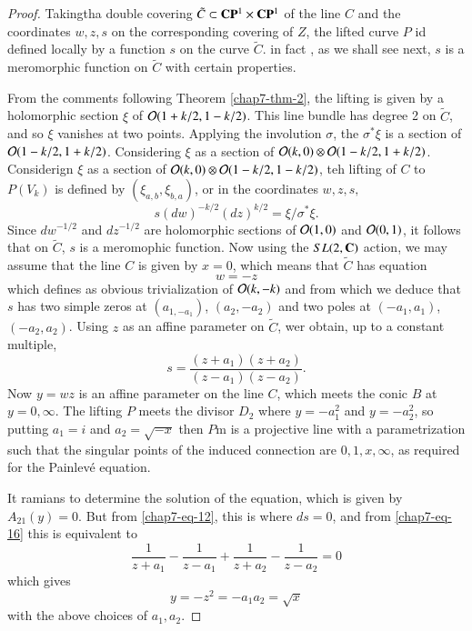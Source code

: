 \begin{proof}
Taking\pageoriginale tha double covering $\tilde{C} \subset \mathbf{C}\mathbf{P}^{1} \times \mathbf{C}\mathbf{P}^{1}$ of the line $C$ and the coordinates $w,z,s$ on the corresponding covering of $Z$, the lifted curve $P$ id defined locally by a function $s$ on the curve
$\tilde{C}$. in fact , as we shall see next, $s$ is a meromorphic function on $\tilde{C}$ with certain properties.

From the comments following Theorem \ref{chap7-thm-2}, the lifting is given by a holomorphic section $\xi$ of $\mathcal{O}(1+k/2, 1-k/2)$. This line bundle has degree 2 on $\tilde{C}$, and so $\xi$ vanishes at two points. Applying the involution $\sigma$, the $\sigma^{*}\xi$ is a section of $\mathcal{O}(1-k/2, 1+k/2)$. Considering $\xi$ as a section of $\mathcal{O}(k,0)\otimes \mathcal{O}(1-k/2, 1+k/2)$. Considerign $\xi$ as a section of $\mathcal{O}(k, 0)\otimes \mathcal{O}(1-k/2, 1-k/2)$, teh lifting of $C$ to $P(V_{k})$ is defined by $(\xi_{a,b}, \xi_{b,a})$, or in the coordinates $w,z,s,$
\begin{equation*}\label{chap7-eq-15}
s(dw)^{-k/2}(dz)^{k/2} = \xi/\sigma^{*}\xi.\tag{15}
\end{equation*}
Since $dw^{-1/2}$ and $dz^{-1/2}$ are holomorphic sections of $\mathcal{O}(1,0)$ and $\mathcal{O}(0,1)$, it follows that on $\tilde{C}$, $s$ is a meromophic function. Now using the $SL(2, \mathbf{C})$ action, we may assume that the line $C$ is given by $x=0$, which means that $\tilde{C}$ has equation
$$
w= -z
$$
which defines as obvious trivialization of $\mathcal{O}(k,-k)$ and from which we deduce that $s$ has  two simple zeros at $(a_{1,-a_{1}})$, $(a_{2}, -a_{2})$ and two poles at $(-a_{1}, a_{1})$, $(-a_{2}, a_{2})$. Using $z$ as an affine parameter on $\tilde{C}$, wer obtain, up to a constant multiple,
\begin{equation*}\label{chap7-eq-16}
s = \dfrac{(z+a_{1})(z+a_{2})}{(z-a_{1})(z-a_{2})}.\tag{16}
\end{equation*}
Now $y = wz$ is an affine parameter on the line $C$, which meets the conic $B$ at $y= 0, \infty$. The lifting $P$ meets the divisor $D_{2}$ where $y=-a_{1}^{2}$ and $y=-a_{2}^{2}$, so putting $a_{1}=i$ and $a_{2}=\sqrt{-x}$ then $P$m is a projective line with a parametrization such that the singular points of the induced connection are $0,1,x, \infty$, as required for the Painlev\'e equation.

It ramians to determine the solution of the equation, which is given by $A_{21}(y)=0$. But from \eqref{chap7-eq-12}, this is where $ds=0$, and from \eqref{chap7-eq-16} this is equivalent to
$$
\dfrac{1}{z+a_{1}}- \dfrac{1}{z-a_{1}}+\dfrac{1}{z+a_{2}}-\dfrac{1}{z-a_{2}} =0
$$
which gives
$$
y=-z^{2} = -a_{1}a_{2}= \sqrt{x}
$$
with the above choices of $a_{1}, a_{2}$.
\end{proof}

